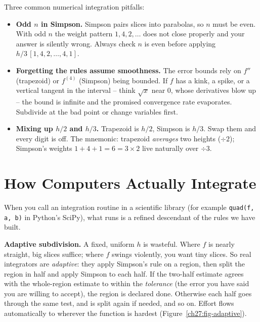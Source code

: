 \begin{trapbox}
Three common numerical integration pitfalls:
\begin{itemize}
\item \textbf{Odd $n$ in Simpson.} Simpson pairs slices into parabolas, so $n$ must be even. With odd $n$ the weight pattern $1,4,2,\dots$ does not close properly and your answer is silently wrong. Always check $n$ is even before applying $h/3\,[1,4,2,\dots,4,1]$.
\item \textbf{Forgetting the rules assume smoothness.} The error bounds rely on $f''$ (trapezoid) or $f^{(4)}$ (Simpson) being bounded. If $f$ has a kink, a spike, or a vertical tangent in the interval -- think $\sqrt{x}$ near $0$, whose derivatives blow up -- the bound is infinite and the promised convergence rate evaporates. Subdivide at the bad point or change variables first.
\item \textbf{Mixing up $h/2$ and $h/3$.} Trapezoid is $h/2$, Simpson is $h/3$. Swap them and every digit is off. The mnemonic: trapezoid \emph{averages} two heights ($\div 2$); Simpson's weights $1{+}4{+}1 = 6 = 3\times 2$ live naturally over $\div 3$.
\end{itemize}
\end{trapbox}

\section{How Computers Actually Integrate}
\label{ch27:computers}

When you call an integration routine in a scientific library (for example \texttt{quad(f, a, b)} in Python's SciPy), what runs is a refined descendant of the rules we have built.

\textbf{Adaptive subdivision.} A fixed, uniform $h$ is wasteful. Where $f$ is nearly straight, big slices suffice; where $f$ swings violently, you want tiny slices. So real integrators are \emph{adaptive}: they apply Simpson's rule on a region, then split the region in half and apply Simpson to each half. If the two-half estimate agrees with the whole-region estimate to within the \emph{tolerance} (the error you have said you are willing to accept), the region is declared done. Otherwise each half goes through the same test, and is split again if needed, and so on. Effort flows automatically to wherever the function is hardest (Figure~\ref{ch27:fig-adaptive}).

